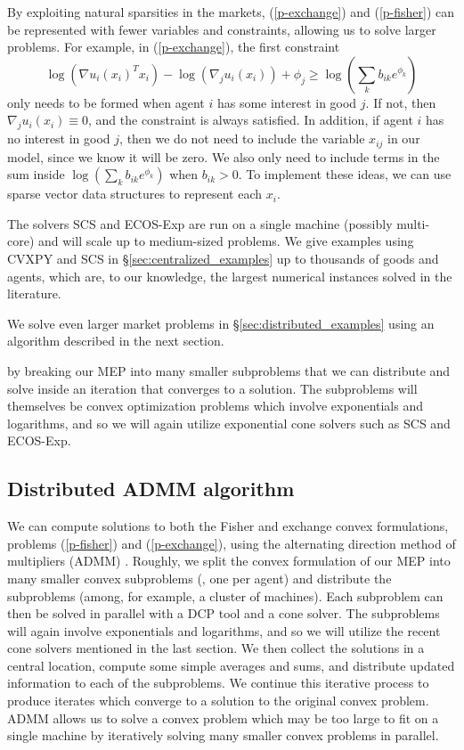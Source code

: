 \documentclass[12pt]{article}
\begin{document}
By exploiting natural sparsities in the markets,
(\ref{p-exchange}) and (\ref{p-fisher}) can be represented with fewer variables
and constraints, allowing us to solve larger problems. For example,
in (\ref{p-exchange}), the first constraint 
\[
\log(\nabla u_i(x_i)^T x_i) - \log(\nabla_j u_i(x_i)) + \phi_j 
\geq \log(\sum_k b_{ik} e^{\phi_k})
\]
only needs to be formed when agent $i$ has some interest in good $j$.
If not, then $\nabla_j u_i(x_i) \equiv 0$, and the constraint is always satisfied.
In addition, if agent $i$ has no interest in good $j$, then we do not
need to include the variable $x_{ij}$ in our model, since we know it will
be zero. We also only need to include terms in the sum inside
$\log(\sum_k b_{ik} e^{\phi_k})$ when $b_{ik} > 0$. To implement these ideas,
we can use sparse vector data structures to represent each $x_i$.

The solvers SCS and ECOS-Exp are run on a single machine (possibly multi-core)
and will scale up to medium-sized problems. We give examples 
using CVXPY and SCS in \S\ref{sec:centralized_examples}
up to thousands of goods and agents, which are, to our knowledge,
the largest numerical instances solved in the literature.

We solve even larger market problems in \S\ref{sec:distributed_examples}
using an algorithm described in the next section.

by breaking our MEP
into many smaller subproblems that we can distribute and solve inside an iteration that
converges to a solution. The subproblems will themselves
be convex optimization problems which involve exponentials and
logarithms, and so we will again utilize exponential
cone solvers such as SCS and ECOS-Exp.


\subsection{Distributed ADMM algorithm}
\label{sec:distributed}

We can compute solutions to both the Fisher and exchange convex formulations,
problems (\ref{p-fisher}) and (\ref{p-exchange}), using the alternating
direction method of multipliers (ADMM) \cite{boyd2011distributed}. Roughly, we
split the convex formulation of our MEP into many smaller convex subproblems
(\eg, one per agent) and distribute the subproblems (among, for example, a cluster
of machines).
Each subproblem can then be solved in parallel with a DCP tool and a cone solver.
The subproblems will again involve exponentials and logarithms, and so we will
utilize the recent cone solvers mentioned in the last section.
We then collect the solutions in a central location,
compute some simple averages and sums, and distribute updated
information to each of the subproblems.
We continue this iterative process to produce iterates which converge
to a solution to the original convex problem.
ADMM allows us to solve a convex problem which may be too large to fit on
a single machine by iteratively solving many smaller convex problems in parallel.
\end{document}
